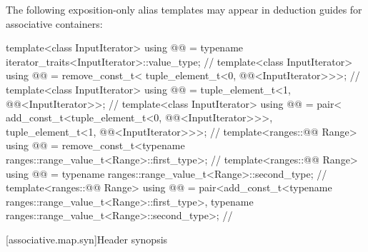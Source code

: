 \pnum
The following exposition-only alias templates may appear in deduction guides for associative containers:
\begin{codeblock}
template<class InputIterator>
  using @@ =
    typename iterator_traits<InputIterator>::value_type;                // \expos
template<class InputIterator>
  using @@ = remove_const_t<
    tuple_element_t<0, @@<InputIterator>>>;                // \expos
template<class InputIterator>
  using @@ =
    tuple_element_t<1, @@<InputIterator>>;                 // \expos
template<class InputIterator>
  using @@ = pair<
    add_const_t<tuple_element_t<0, @@<InputIterator>>>,
    tuple_element_t<1, @@<InputIterator>>>;                // \expos
template<ranges::@@ Range>
  using @@ =
    remove_const_t<typename ranges::range_value_t<Range>::first_type>;  // \expos
template<ranges::@@ Range>
  using @@ = typename ranges::range_value_t<Range>::second_type; // \expos
template<ranges::@@ Range>
  using @@ =
    pair<add_const_t<typename ranges::range_value_t<Range>::first_type>,
         typename ranges::range_value_t<Range>::second_type>;           // \expos
\end{codeblock}

[associative.map.syn]{Header  synopsis}

